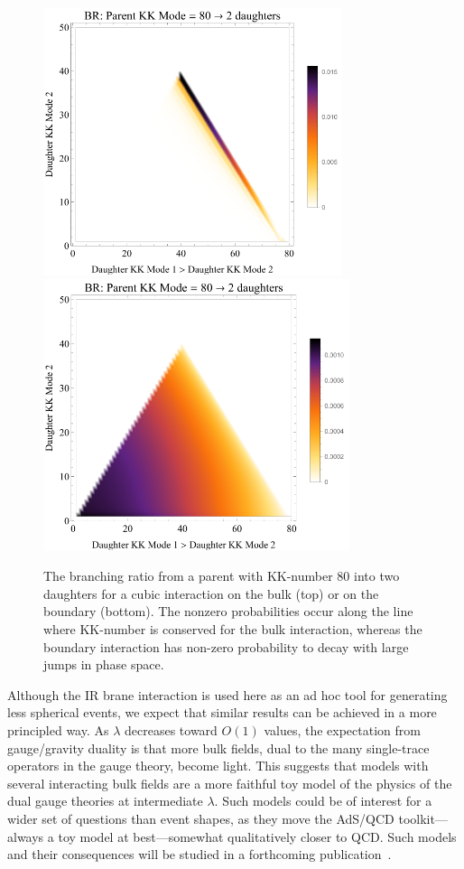 \begin{figure}[tb!]
	\centering
	\includegraphics[width=0.78\textwidth]{figures/DS_KKBR_bulk.pdf}\vspace{1cm}
	\includegraphics[width=0.8\textwidth]{figures/DS_KKBR_boundary.pdf}
	\caption{The branching ratio from a parent with KK-number 80 into two daughters for a cubic interaction on the bulk (top) or on the boundary (bottom). The nonzero probabilities occur along the line where KK-number is conserved for the bulk interaction, whereas the boundary interaction has non-zero probability to decay with large jumps in phase space. }
	\label{fig:BR}
\end{figure}

Although the IR brane interaction is used here as an ad hoc tool for generating less spherical events, we expect that similar results can be achieved in a more principled way. As $\lambda$ decreases toward $O(1)$ values, the expectation from gauge/gravity duality is that more bulk fields, dual to the many single-trace operators in the gauge theory, become light. This suggests that models with several interacting bulk fields are a more faithful toy model of the physics of the dual gauge theories at intermediate $\lambda$. Such models could be of interest for a wider set of questions than event shapes, as they move the AdS/QCD toolkit---always a toy model at best---somewhat qualitatively closer to QCD. Such models and their consequences will be studied in a forthcoming publication~\cite{showersinprogress}.

